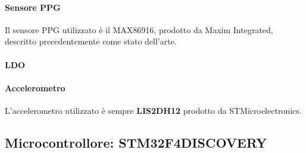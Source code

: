 \paragraph{Sensore PPG} Il sensore PPG utilizzato è il MAX86916, prodotto da Maxim Integrated, descritto precedentemente come stato dell'arte.

\paragraph{LDO} 

\paragraph{Accelerometro} L'accelerometro utilizzato è sempre \textbf{LIS2DH12} prodotto da STMicroelectronics.

\subsection{Microcontrollore: STM32F4DISCOVERY}

